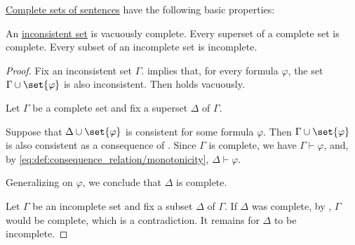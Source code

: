\begin{proposition}\label{thm:def:complete_set_of_sentences}
  \hyperref[def:complete_set_of_sentences]{Complete sets of sentences} have the following basic properties:
  \begin{thmenum}
     An \hyperref[def:consistent_set_of_sentences]{inconsistent set} is vacuously complete.
     Every superset of a complete set is complete.
     Every subset of an incomplete set is incomplete.
  \end{thmenum}
\end{proposition}
\begin{proof}
   Fix an inconsistent set \( \Gamma \).  implies that, for every formula \( \varphi \), the set \( \Gamma \cup \set{ \varphi } \) is also inconsistent. Then  holds vacuously.

   Let \( \Gamma \) be a complete set and fix a superset \( \Delta \) of \( \Gamma \).

  Suppose that \( \Delta \cup \set{ \varphi } \) is consistent for some formula \( \varphi \). Then \( \Gamma \cup \set{ \varphi } \) is also consistent as a consequence of . Since \( \Gamma \) is complete, we have \( \Gamma \vdash \varphi \), and, by \eqref{eq:def:consequence_relation/monotonicity}, \( \Delta \vdash \varphi \).

  Generalizing on \( \varphi \), we conclude that \( \Delta \) is complete.

   Let \( \Gamma \) be an incomplete set and fix a subset \( \Delta \) of \( \Gamma \). If \( \Delta \) was complete, by , \( \Gamma \) would be complete, which is a contradiction. It remains for \( \Delta \) to be incomplete.
\end{proof}

